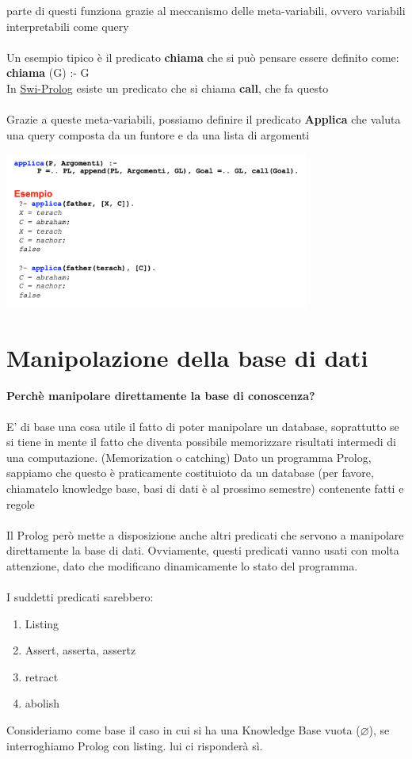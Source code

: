 \documentclass[12pt, a4paper, openany, oneside]{book}
\begin{document}
parte di questi funziona grazie al meccanismo delle meta-variabili, ovvero 
variabili interpretabili come query\\ \\
Un esempio tipico è il predicato \textbf{chiama} che si può pensare essere
definito come: \color{red} \textbf{chiama}  \color{black}(G) :- G \\
In \href{https://swish.swi-prolog.org/}{Swi-Prolog} esiste un predicato che si
chiama \textbf{call}, che fa questo \\ \\
Grazie a queste meta-variabili, possiamo definire il predicato \textbf{Applica}
che valuta una query composta da un funtore e da una lista di argomenti
\begin{center}
\includegraphics[width=0.75\textwidth]{7}
\end{center}
\section{Manipolazione della base di dati}  
\paragraph{Perchè manipolare direttamente la base di conoscenza? }E' di base 
una cosa utile il fatto di poter manipolare un database, soprattutto se si tiene
in mente il fatto che diventa possibile memorizzare risultati intermedi di una
computazione. (Memorization o catching)
Dato un programma Prolog, sappiamo che questo è praticamente costituioto da un
database (per favore, chiamatelo knowledge base, basi di dati è al prossimo 
semestre) contenente fatti e regole\\ \\
Il Prolog però mette a disposizione anche altri predicati che servono a 
manipolare direttamente la base di dati. Ovviamente, questi predicati vanno 
usati con molta attenzione, dato che modificano dinamicamente lo stato del 
programma.\\ \\
I suddetti predicati sarebbero:
\begin{enumerate}
	\item Listing
	\item Assert, asserta, assertz
	\item retract
	\item abolish
\end{enumerate}
Consideriamo come base il caso in cui si ha una Knowledge Base vuota 
($ \varnothing $), se interroghiamo Prolog con listing. lui ci risponderà sì.
\end{document}
